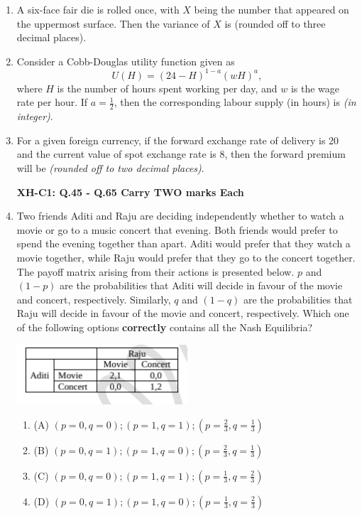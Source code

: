 \documentclass[journal,12pt,onecolumn]{exam}
\theoremstyle{remark}
\begin{document}
\begin{enumerate}
  \item A six-face fair die is rolled once, with $X$ being the number that appeared on the uppermost surface. Then the variance of $X$ is \underline{\hspace{3cm}} (rounded off to three decimal places).
  
  \item Consider a Cobb-Douglas utility function given as 
  \[
  U(H) = (24 - H)^{1-a} (wH)^a,
  \]
  where $H$ is the number of hours spent working per day, and $w$ is the wage rate per hour. If $a = \frac{1}{2}$, then the corresponding labour supply (in hours) is \underline{\hspace{3cm}} \textit{(in integer)}.
  
  \item For a given foreign currency, if the forward exchange rate of delivery is 20 and the current value of spot exchange rate is 8, then the forward premium will be \underline{\hspace{3cm}} \textit{(rounded off to two decimal places)}.
  

\newpage

\textbf{XH-C1: Q.45 - Q.65 Carry TWO marks Each}

\item Two friends Aditi and Raju are deciding independently whether to watch a movie or go to a music concert that evening. Both friends would prefer to spend the evening together than apart. Aditi would prefer that they watch a movie together, while Raju would prefer that they go to the concert together. The payoff matrix arising from their actions is presented below. $p$ and $(1-p)$ are the probabilities that Aditi will decide in favour of the movie and concert, respectively. Similarly, $q$ and $(1-q)$ are the probabilities that Raju will decide in favour of the movie and concert, respectively. Which one of the following options \textbf{correctly} contains all the Nash Equilibria?

\begin{center}
    \includegraphics[width=0.5\textwidth]{figs/a3q45.png}
    
\end{center}
\begin{enumerate}
\item[] (A) \quad $(p=0, q=0); (p=1, q=1); \left(p=\frac{2}{3}, q=\frac{1}{3}\right)$
\item[] (B) \quad $(p=0, q=1); (p=1, q=0); \left(p=\frac{2}{3}, q=\frac{1}{3}\right)$
\item[] (C) \quad $(p=0, q=0); (p=1, q=1); \left(p=\frac{1}{3}, q=\frac{2}{3}\right)$
\item[] (D) \quad $(p=0, q=1); (p=1, q=0); \left(p=\frac{1}{3}, q=\frac{2}{3}\right)$
\end{enumerate}


\end{enumerate}
\end{document}
